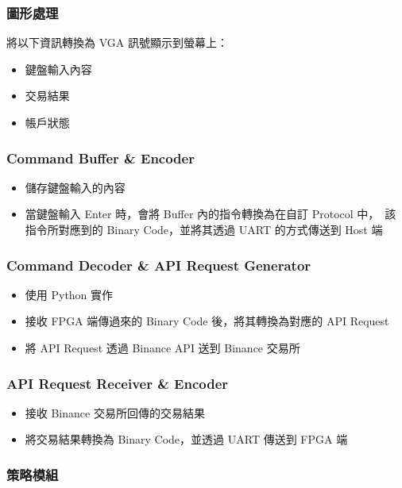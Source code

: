 \documentclass[10.5pt,compsoc,UTF8]{CjC}
\theoremstyle{mystyle}
\begin{document}
\subsubsection*{圖形處理}

將以下資訊轉換為 VGA 訊號顯示到螢幕上：
\begin{itemize}
  \item 鍵盤輸入內容
  \item 交易結果
  \item 帳戶狀態
\end{itemize}

\subsubsection*{Command Buffer \& Encoder}

\begin{itemize}
  \item 儲存鍵盤輸入的內容
  \item 當鍵盤輸入 Enter 時，會將 Buffer 內的指令轉換為在自訂 Protocol 中，\
  該指令所對應到的 Binary Code，並將其透過 UART 的方式傳送到 Host 端
\end{itemize}

\subsubsection*{Command Decoder \& API Request Generator}

\begin{itemize}
  \item 使用 Python 實作
  \item 接收 FPGA 端傳過來的 Binary Code 後，將其轉換為對應的 API Request
  \item 將 API Request 透過 Binance API 送到 Binance 交易所
\end{itemize}

\subsubsection*{API Request Receiver \& Encoder}

\begin{itemize}
  \item 接收 Binance 交易所回傳的交易結果
  \item 將交易結果轉換為 Binary Code，並透過 UART 傳送到 FPGA 端
\end{itemize}

\subsubsection*{策略模組}
\end{document}
